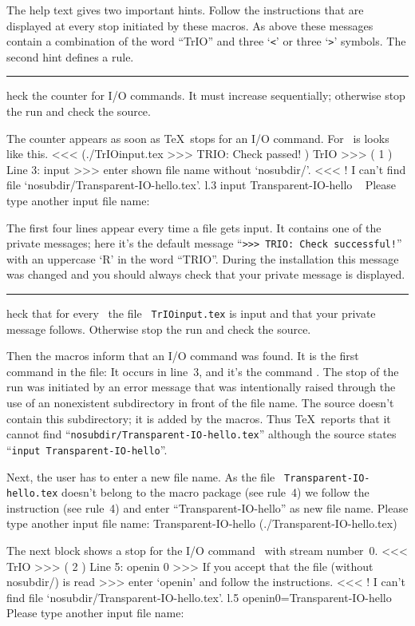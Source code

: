The help text gives two important hints. Follow the instructions that
are displayed at every stop initiated by these macros. As above these
messages contain a combination of the word ``TrIO'' and three `{\tt<}'
or three `{\tt>}' symbols. The second hint defines a rule.

 \rule6 Check the counter for I/O commands. It must increase
sequentially; otherwise stop the run and check the source.
\smallskip

The counter appears as soon as \TeX\ stops for an I/O
command. For \cs\ is looks like this.
\beginverbatim
<<<\parni
(./TrIOinput.tex\parni
>>> TRIO: Check passed!\parni
)\parni
TrIO >>> ( 1 ) Line 3: input\parni
>>> enter shown file name without `nosubdir/'.\parni
<<<\parni
! I can't find file `nosubdir/Transparent-IO-hello.tex'.\parni
l.3 \bs input Transparent-IO-hello\parni
\ \parni
Please type another input file name: \endverbatim

The first four lines appear every time a file gets input. It contains
one of the private messages; here it's the default message ``{\tt>>>
TRIO: Check successful!}'' with an uppercase `R' in the word
``TRIO''. During the installation this message was changed and you
should always check that your private message is displayed.

 \rule7 Check that for every \cs\ the file {\tt
TrIOinput.tex} is input and that your private message
follows. Otherwise stop the run and check the source.
\smallskip

Then the macros inform that an I/O command was found. It is the first
command in the file: It occurs in line~3, and it's the
command \cs. The stop of the run was initiated by an error
message that was intentionally raised through the use of an
nonexistent subdirectory in front of the file name. The source doesn't
contain this subdirectory; it is added by the macros. Thus \TeX\
reports that it cannot find ``{\tt nosubdir/Transparent-IO-hello.tex}'' although the
source states ``{\tt\bs input Transparent-IO-hello}''.

Next, the user has to enter a new file name. As the file {\tt
Transparent-IO-hello.tex} doesn't belong to the macro package (see rule~4) we follow
the instruction (see rule~4) and enter ``Transparent-IO-hello'' as new file name.
\beginverbatim
Please type another input file name: Transparent-IO-hello\parni
(./Transparent-IO-hello.tex)\endverbatim

The next block shows a stop for the I/O command \cs\openin\ with
stream number~0.
\beginverbatim
<<<\parni
TrIO >>> ( 2 ) Line 5: openin 0\parni
>>> If you accept that the file (without nosubdir/) is read\parni
>>> enter `openin' and follow the instructions.\parni
<<<\parni
! I can't find file `nosubdir/Transparent-IO-hello.tex'.\parni
l.5 \bs openin0=Transparent-IO-hello\parni
\ \parni
Please type another input file name: \endverbatim

